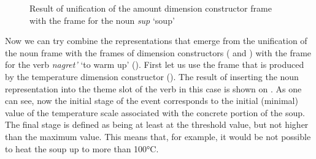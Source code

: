 \begin{figure}
\centering
{}
\caption{Result of unification of the amount dimension constructor frame with the frame for the noun \textit{sup} `soup' \label{frame:soup:amount}}
\end{figure}

Now we can try combine the representations that emerge from the unification of the noun frame with the  frames of dimension constructors ( and ) with the frame for the verb \textit{nagret'} `to warm up' (). First let us use the frame that is produced by the temperature dimension constructor (). The result of inserting the noun representation into the theme slot of the verb in this case is shown on . As one can see, now the initial stage of the event corresponds to the initial (minimal) value of the temperature scale associated with the concrete portion of the soup. The final stage is defined as being at least at the threshold value, but not higher than the maximum value. This means that, for example, it would be not possible to heat the soup up to more than 100°C. 

